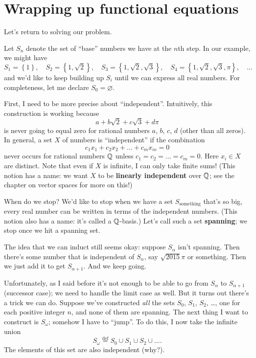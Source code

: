 \section{Wrapping up functional equations}
Let's return to solving our problem.

Let $S_n$ denote the set of ``base'' numbers we have at the $n$th step.
In our example, we might have
\[
	S_1 = \left\{ 1 \right\}, \quad
	S_2 = \left\{ 1, \sqrt 2 \right\}, \quad
	S_3 = \left\{ 1, \sqrt 2, \sqrt 3 \right\}, \quad
	S_4 = \left\{ 1, \sqrt 2, \sqrt 3, \pi \right\}, \quad
	\dots
\]
and we'd like to keep building up $S_i$ until we can express all real numbers.
For completeness, let me declare $S_0 = \varnothing$.

First, I need to be more precise about ``independent''.
Intuitively, this construction is working because
\[ a + b \sqrt 2 + c \sqrt 3 + d \pi \]
is never going to equal zero for rational numbers $a$, $b$, $c$, $d$ (other than all zeros).
In general, a set $X$ of numbers is ``independent'' if the combination
\[ c_1x_1 + c_2x_2 + \dots + c_mx_m = 0 \]
never occurs for rational numbers $\mathbb Q$ unless $c_1 = c_2 = \dots = c_m = 0$.
Here $x_i \in X$ are distinct. Note that even if $X$ is infinite,
I can only take finite sums!
(This notion has a name: we want $X$ to be \textbf{linearly independent} over $\mathbb Q$;
see the chapter on vector spaces for more on this!)

When do we stop?
We'd like to stop when we have a set $S_{\text{something}}$ that's so big,
every real number can be written in terms of the independent numbers.
(This notion also has a name: it's called a $\mathbb Q$-basis.)
Let's call such a set \textbf{spanning};
we stop once we hit a spanning set.

The idea that we can induct still seems okay:
suppose $S_\alpha$ isn't spanning.
Then there's some number that is independent of $S_\alpha$, say $\sqrt{2015}\pi$ or something.
Then we just add it to get $S_{\alpha+1}$.
And we keep going.

Unfortunately, as I said before it's not enough to be able to go from $S_\alpha$ to $S_{\alpha+1}$
(successor case); we need to handle the limit case as well.
But it turns out there's a trick we can do.
Suppose we've constructed \emph{all} the sets $S_0$, $S_1$, $S_2$, \dots, one for each positive integer $n$,
and none of them are spanning.
The next thing I want to construct is $S_\omega$; somehow I have to ``jump''.
To do this, I now take the infinite union
\[ S_\omega \overset{\text{def}}{=} S_0 \cup S_1 \cup S_2 \cup \dots. \]
The elements of this set are also independent (why?).

